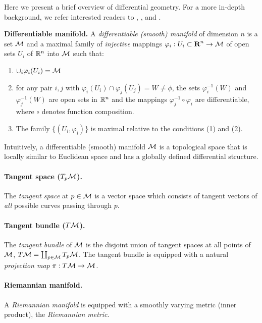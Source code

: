 Here we present a brief overview of differential geometry. For a more in-depth background, we refer interested readers to \cite{do1992riemannian}, \cite{lee2003smooth}, and \cite{spivak1981comprehensive}.


\textbf{Differentiable manifold.}
A \textit{differentiable (smooth) manifold} of dimension $n$ is a set $\mathcal{M}$ and a maximal family of \textit{injective} mappings $\varphi_{i}:U_{i}
\subset \textbf{R}^{n} \rightarrow \mathcal{M}$ of open sets $U_{i}$ of
$\mathbb{R}^{n}$ into $\mathcal{M}$ such that:
\begin{enumerate}
\item $\cup_{i}\varphi_{i}(U_{i}) =\mathcal{M}$
\item for any pair $i,j$ with $\varphi_{i} (U_{i}) \cap
\varphi_{j} (U_{j}) = W \neq \phi$, the sets $\varphi_{i}^{-1}(W)$
and $\varphi_{j}^{-1}(W)$ are open sets in $\mathbb{R}^{n}$ and the
mappings $\varphi_{j}^{-1} \circ \varphi_{i}$ are
differentiable, where $\circ$ denotes function composition. 
\item The family $\{(U_{i},\varphi_{i})\}$ is maximal relative to
the conditions (1) and (2). 
\end{enumerate}

Intuitively, a differentiable (smooth) manifold $\mathcal{M}$ is a topological
space that is locally similar to Euclidean space and has a globally
defined differential structure. 

\paragraph{Tangent space ($T_{p}\mathcal{M}$).} The \textit{tangent space} at $p \in \mathcal{M}$ is a vector space which consists of 
tangent vectors of \textit{all} possible curves passing through $p$. 

\paragraph{Tangent bundle ($T\mathcal{M}$).} The \textit{tangent bundle} of $\mathcal{M}$ is the disjoint union of tangent spaces at all points of $\mathcal{M}$, 
$T\mathcal{M} = \coprod_{p \in \mathcal{M}}T_{p}\mathcal{M}$. 
The tangent bundle is equipped with a natural \textit{projection map} $\pi: T\mathcal{M} \rightarrow \mathcal{M}$. 

\paragraph{Riemannian manifold.} A \textit{Riemannian manifold} is 
equipped with a
smoothly varying metric (inner product), the \textit{Riemannian metric}. 

